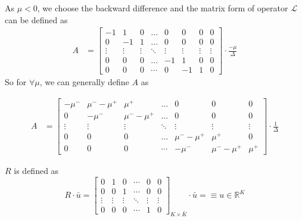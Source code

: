 \documentclass[11pt]{article}
\newcommand{\R}{\ensuremath{\mathbb{R}}}
\begin{document}
As $\mu<0$, we choose the backward difference and the matrix form of operator $\mathcal{L}$ can be defined as
\begin{align}
A &= \begin{bmatrix}
-1&1&0&\dots&0&0&0&0\\
0&-1&1&\dots&0&0&0&0\\
\vdots&\vdots&\vdots&\ddots&\vdots&\vdots&\vdots&\vdots\\
0&0&0&\dots&-1&1&0&0\\
0&0&0&\cdots&0&-1&1&0
\end{bmatrix}\cdot \frac{-\mu}{\Delta}
\end{align}
So for $\forall\mu$, we can generally define $A$ as

\begin{align}
A &= \begin{bmatrix}
-\mu^-&\mu^--\mu^+&\mu^+&\dots&0&0&0\\
0&-\mu^-&\mu^--\mu^+&\dots&0&0&0\\
\vdots&\vdots&\vdots&\ddots&\vdots&\vdots&\vdots\\
0&0&0&\dots&\mu^--\mu^+&\mu^+&0\\
0&0&0&\cdots&-\mu^-&\mu^--\mu^+&\mu^+
\end{bmatrix}\cdot \frac{1}{\Delta}
\end{align}

$R$ is defined as
\begin{equation}
R\cdot \bar{u} =\begin{bmatrix}
0&1&0&\cdots&0&0\\
0&0&1&\cdots&0&0\\
\vdots&\vdots&\vdots&\ddots&\vdots&\vdots\\
0&0&0&\cdots&1&0
\end{bmatrix}_{K\times\bar{K}}\cdot \bar{u}
=\equiv u\in \R^{K}
\end{equation}
\end{document}
